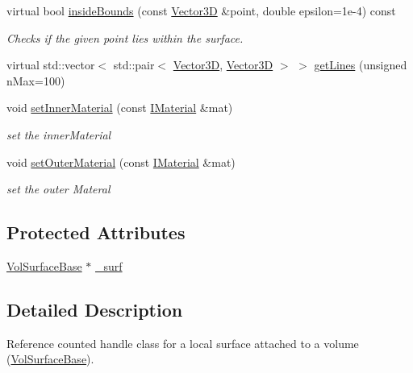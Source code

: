\begin{DoxyCompactItemize}
virtual bool \hyperlink{class_d_d4hep_1_1_d_d_rec_1_1_vol_surface_a6a3d39ebb8b0be132e4141cb9ea650a6}{insideBounds} (const \hyperlink{class_d_d_surfaces_1_1_vector3_d}{Vector3D} \&point, double epsilon=1e-\/4) const 
\begin{DoxyCompactList}\small\item\em Checks if the given point lies within the surface. \item\end{DoxyCompactList}\item 
virtual std::vector$<$ std::pair$<$ \hyperlink{class_d_d_surfaces_1_1_vector3_d}{Vector3D}, \hyperlink{class_d_d_surfaces_1_1_vector3_d}{Vector3D} $>$ $>$ \hyperlink{class_d_d4hep_1_1_d_d_rec_1_1_vol_surface_a0800bcb853b43a688721247dd4031122}{getLines} (unsigned nMax=100)
\item 
void \hyperlink{class_d_d4hep_1_1_d_d_rec_1_1_vol_surface_a17eba889b8f154c12db6c82dd6769845}{setInnerMaterial} (const \hyperlink{class_d_d_surfaces_1_1_i_material}{IMaterial} \&mat)
\begin{DoxyCompactList}\small\item\em set the innerMaterial \item\end{DoxyCompactList}\item 
void \hyperlink{class_d_d4hep_1_1_d_d_rec_1_1_vol_surface_af6a4ee6256e72d0b10e7ebfb54fc28da}{setOuterMaterial} (const \hyperlink{class_d_d_surfaces_1_1_i_material}{IMaterial} \&mat)
\begin{DoxyCompactList}\small\item\em set the outer Materal \item\end{DoxyCompactList}\end{DoxyCompactItemize}
\subsection*{Protected Attributes}
\begin{DoxyCompactItemize}
\item 
\hyperlink{class_d_d4hep_1_1_d_d_rec_1_1_vol_surface_base}{VolSurfaceBase} $\ast$ \hyperlink{class_d_d4hep_1_1_d_d_rec_1_1_vol_surface_a434add1326a87d6d6e5ee0209777cd45}{\_\-surf}
\end{DoxyCompactItemize}


\subsection{Detailed Description}
Reference counted handle class for a local surface attached to a volume (\hyperlink{class_d_d4hep_1_1_d_d_rec_1_1_vol_surface_base}{VolSurfaceBase}).

